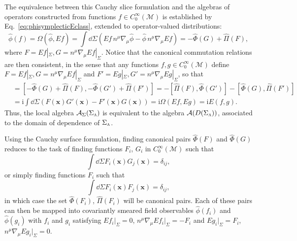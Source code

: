 \documentclass[letterpaper,12pt,titlepage,oneside,final]{book}
\newcommand{\M}{\mathcal{M}}
\newcommand{\ii}{\mathrm{i}}
\newcommand{\tc}[1]{\textsc{#1}}
\begin{document}
The equivalence between this Cauchy slice formulation and the algebras of operators constructed from functions $f\in C_0^\infty(\M)$ is established by Eq.~\eqref{eq:phisymplecticEclass}, extended to operator-valued distributions:
\begin{equation}\label{eq:phiPhiPi}
    \hat{\phi}(f) = \Omega(\hat{\phi},Ef) = \int \dd \Sigma (Ef\, n^\mu \nabla_\mu \hat{\phi} - \hat{\phi}\, n^\mu \nabla_\mu Ef) = - \hat{\Phi}(G) + \hat{\Pi}(F),
\end{equation}
where $F = Ef|_\Sigma, G = n^\mu \nabla_\mu Ef|_\Sigma$. Notice that the canonical commutation relations are then consistent, in the sense that any functions $f,g\in C_0^\infty(\M)$ define $F = Ef|_\Sigma, G = n^\mu \nabla_\mu Ef|_\Sigma$ and $F' = Eg|_\Sigma, G' = n^\mu \nabla_\mu Eg|_\Sigma$, so that
\begin{align}
    [\hat{\phi}(f),\hat{\phi}(g)] &= [-\hat{\Phi}(G) + \hat{\Pi}(F), - \hat{\Phi}(G') + \hat{\Pi}(F')]= -[\hat{\Pi}(F),\hat{\Phi}(G')] - [\hat{\Phi}(G),\hat{\Pi}(F')]\nonumber\\
    &= \ii \int \dd \Sigma (F(\bm x) G'(\bm x) - F'(\bm x)G(\bm x)) = \ii \Omega(Ef,Eg) = \ii E(f,g).
\end{align}
Thus, the local algebra $\mathcal{A}_\Sigma(\Sigma_\tc{a})$ is equivalent to the algebra $\mathcal{A}(D(\Sigma_\tc{a}))$, associated to the domain of dependence of $\Sigma_\tc{a}$.

Using the Cauchy surface formulation, finding canonical pairs $\hat{\Phi}(F)$ and $\hat{\Phi}(G)$ reduces to the task of finding functions $F_i$, $G_i$ in $C_0^\infty(\M)$ such that
\begin{equation}
    \int \dd \Sigma F_i(\bm x) G_j(\bm x) = \delta_{ij},
\end{equation}
or simply finding functions $F_i$ such that
\begin{equation}\label{eq:normFiFj}
    \int \dd \Sigma F_i(\bm x) F_j(\bm x) = \delta_{ij},
\end{equation}
in which case the set $\hat{\Phi}(F_i)$, $\hat{\Pi}(F_i)$ will be canonical pairs. Each of these pairs can then be mapped into covariantly smeared field observables $\hat{\phi}(f_i)$ and $\hat{\phi}(g_i)$ with $f_i$ and $g_i$ satisfying $Ef_i|_\Sigma = 0$, $n^\mu \nabla_\mu Ef_i|_\Sigma = -F_i$ and $Eg_i|_\Sigma = F_i$, $n^\mu \nabla_\mu Eg_i|_\Sigma = 0$.

\end{document}

